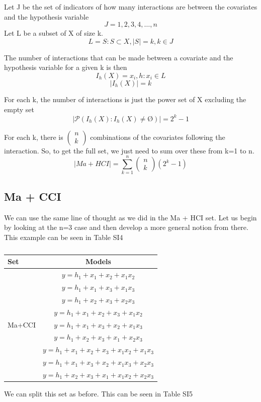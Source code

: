 Let J be the set of indicators of how many interactions are between the covariates and the hypothesis variable 
\[J=\left.1,2,3,4,\dots ,n\right.\] 
Let L be a subset of X of size k.
\[L=\left.S:S\subset X,\left|S\right|=k,k\in J\right.\] 

The number of interactions that can be made between a covariate and the hypothesis variable for a given k is then
\[I_h\left(X\right)=\left.\left.x_i,h\right.:x_i\in L\right.\] 
\[\left|I_h\left(X\right)\right|=k\] 

For each k, the number of interactions is just the power set of X excluding the empty set
\[\left|\mathcal{P}\left(I_h\left(X\right):I_h\left(X\right)\neq \textrm{\O}\right)\right|=2^k-1\] 

For each k, there is $\left( \begin{array}{c}
n \\ 
k \end{array}
\right)$ combinations of the covariates following the interaction. So, to get the full set, we just need to sum over these from k=1 to n.
\[\left|Ma+HCI\right|=\sum^n_{k=1}{\left( \begin{array}{c}
n \\ 
k \end{array}
\right)\left(2^k-1\right)}\] 
\textbf{}

\subsection{Ma + CCI}

We can use the same line of thought as we did in the Ma + HCI set. Let us begin by looking at the n=3 case and then develop a more general notion from there. This example can be seen in Table SI4 
\begin{table}
\caption{}
\begin{tabular}{lc} \hline 
\toprule
Set & Models \\
\midrule
\multirow{9}{*}{Ma+CCI} & $y=h_1+x_1+x_2+x_1x_2$\\ & $y=h_1+x_1+x_3+x_1x_3$\\ & $y=h_1+x_2+x_3+x_2x_3$\\ & $y=h_1+x_1+x_2+x_3+x_1x_2$\\ & $y=h_1+x_1+x_3+x_2+x_1x_3$\\ & $y=h_1+x_2+x_3+x_1+x_2x_3$\\ & $y=h_1+x_1+x_2+x_3+x_1x_2+x_1x_3$\\ & $y=h_1+x_1+x_3+x_2+x_1x_3+x_2x_3$\\ & $y=h_1+x_2+x_3+x_1+x_1x_2+x_2x_3$ \\
\bottomrule
\end{tabular}
\end{table}
We can split this set as before. This can be seen in Table SI5

